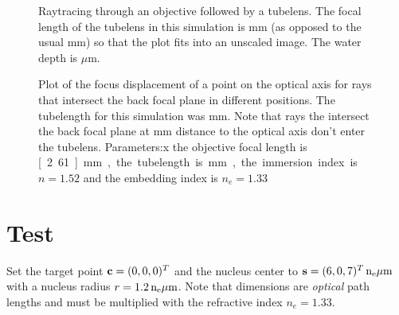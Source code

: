 \documentclass[twocolumn,DIV19]{scrartcl}
\begin{document}
\begin{figure}[!hbt]
  \centering
  \caption{Raytracing through an objective followed by a tubelens. The
    focal length of the tubelens in this simulation is \unit[16]{mm}
    (as opposed to the usual \unit[160]{mm}) so that the plot fits
    into an unscaled image. The water depth is \unit[10]{$\mu$m}.}
  \label{fig:screen_microscope-aberrate}
\end{figure}

\begin{figure}[!hbt]
  \centering
  \caption{Plot of the focus displacement of a point on the optical
    axis for rays that intersect the back focal plane in different
    positions. The tubelength for this simulation was
    \unit[160]{mm}. Note that rays the intersect the back focal plane
    at \unit[50]{mm} distance to the optical axis don't enter the
    tubelens. Parameters:x the objective focal length is
    \unit[2.61]{mm}, the tubelength is \unit[160]{mm}, the immersion
    index is $n=1.52$ and the embedding index is $n_e=1.33$ }
  \label{fig:focus-displacement}
\end{figure}

\section{Test}
Set the target point $\mathbf{c}=(0,0,0)^T$ and the nucleus center to
$\s=\unit[(6,0,7)^T]{n_e \mu m}$ with a nucleus radius
$r=\unit[1.2]{n_e \mu m}$. Note that dimensions are \emph{optical}
path lengths and must be multiplied with the refractive index
$n_e=1.33$.
\end{document}
